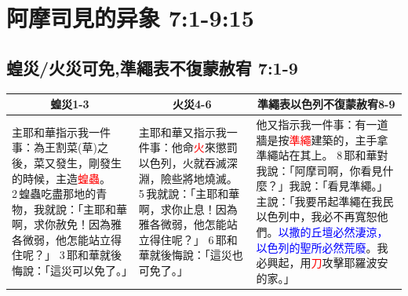 \section{阿摩司見的异象 7:1-9:15}

\subsection{蝗災/火災可免,準繩表不復蒙赦宥 7:1-9}
\begin{table}[H]
\centering
\begin{tabular}{p{}|p{4.750cm}|p{6.750cm}}\hline\hline
\multicolumn{1}{c|}{蝗災1-3}&\multicolumn{1}{c|}{火災4-6}&\multicolumn{1}{c}{準繩表以色列不復蒙赦宥8-9}\\\hline
主耶和華指示我一件事：為王割菜(草)之後，菜又發生，剛發生的時候，主造\textcolor{red}{蝗蟲}。 2 蝗蟲吃盡那地的青物，我就說：「主耶和華啊，求你赦免！因為雅各微弱，他怎能站立得住呢？」 3 耶和華就後悔說：「這災可以免了。」
&主耶和華又指示我一件事：他命\textcolor{red}{火}來懲罰以色列，火就吞滅深淵，險些將地燒滅。 5 我就說：「主耶和華啊，求你止息！因為雅各微弱，他怎能站立得住呢？」 6 耶和華就後悔說：「這災也可免了。」
&他又指示我一件事：有一道牆是按\textcolor{red}{準繩}建築的，主手拿準繩站在其上。 8 耶和華對我說：「阿摩司啊，你看見什麼？」我說：「看見準繩。」主說：「我要吊起準繩在我民以色列中，我必不再寬恕他們。\textcolor{blue}{以撒的丘壇必然淒涼，以色列的聖所必然荒廢}。我必興起，用\textcolor{red}{刀}攻擊耶羅波安的家。」\\\hline
\end{tabular}
\end{table}
 

